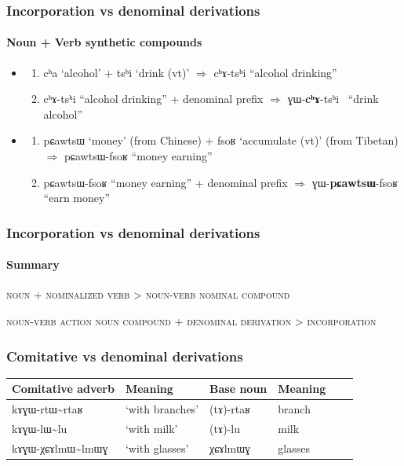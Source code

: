 \documentclass[xcolor=table]{beamer}
\newcommand{\ipa}[1]{{\phon \mbox{#1}}} %
\begin{document}
    \begin{frame} 
\frametitle{Incorporation vs denominal derivations} 
\framesubtitle{Noun + Verb synthetic compounds} 

\begin{itemize}
\item
\begin{enumerate}
\item \ipa{cʰa} `alcohol' + \ipa{tsʰi} `drink (vt)' $\Rightarrow$  \ipa{cʰɤ-tsʰi} ``alcohol drinking''
\item \ipa{cʰɤ-tsʰi} ``alcohol drinking'' + denominal prefix $\Rightarrow$  \ipa{ɣɯ-\textbf{cʰɤ}-tsʰi } ``drink alcohol''
\end{enumerate}
\item
\begin{enumerate}
\item \ipa{pɕawtsɯ} `money' (from Chinese) + \ipa{fsoʁ} `accumulate (vt)' (from Tibetan) $\Rightarrow$   \ipa{pɕawtsɯ-fsoʁ} ``money earning''
\item \ipa{pɕawtsɯ-fsoʁ} ``money earning'' + denominal prefix $\Rightarrow$  \ipa{ɣɯ-\textbf{pɕawtsɯ}-fsoʁ} ``earn money''
\end{enumerate}
\end{itemize}

 \end{frame}    
 
    \begin{frame} 
\frametitle{Incorporation vs denominal derivations} 
\framesubtitle{Summary}
 \begin{exe}
\ex
 \glt  \textsc{noun} + \textsc{nominalized verb} > \textsc{noun-verb nominal compound}
\end{exe} 

 \begin{exe}
\ex
 \glt  \textsc{noun-verb action noun compound} + \textsc{denominal derivation} > \textsc{incorporation}
\end{exe} 

 \end{frame}    
 
 
     \begin{frame} 
\frametitle{Comitative vs denominal derivations} 
 
 \begin{tabular}{llllll}
\toprule
Comitative adverb & Meaning &Base noun  & Meaning \\
\midrule
 \ipa{kɤɣɯ-rtɯ\textasciitilde{}rtaʁ} & `with branches' & \ipa{(tɤ)-rtaʁ} & branch \\
  \ipa{kɤɣɯ-lɯ\textasciitilde{}lu} & `with milk' & \ipa{(tɤ)-lu} & milk \\
    \ipa{kɤɣɯ-χɕɤlmɯ\textasciitilde{}lmɯɣ} & `with glasses' & \ipa{χɕɤlmɯɣ} & glasses \\
\bottomrule
\end{tabular}

 \end{frame}    
 
\end{document}
